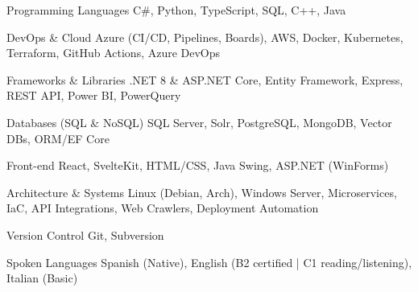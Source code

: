 
\begin{cvskills}
    \cvskill
    {Programming Languages}
    {C\#, Python, TypeScript, SQL, C++, Java}

    \cvskill
    {DevOps \& Cloud}
    {Azure (CI/CD, Pipelines, Boards), AWS, Docker, Kubernetes, Terraform, GitHub Actions, Azure DevOps}

    \cvskill
    {Frameworks \& Libraries}
    {.NET 8 \& ASP.NET Core, Entity Framework, Express, REST API, Power BI, PowerQuery}

    \cvskill
    {Databases (SQL \& NoSQL)}
    {SQL Server, Solr, PostgreSQL, MongoDB, Vector DBs, ORM/EF Core}

    \cvskill
    {Front-end}
    {React, SvelteKit, HTML/CSS, Java Swing, ASP.NET (WinForms)}

    \cvskill
    {Architecture \& Systems}
    {Linux (Debian, Arch), Windows Server, Microservices, IaC, API Integrations,
     Web Crawlers, Deployment Automation}

    \cvskill
    {Version Control}
    {Git, Subversion}

    \cvskill
    {Spoken Languages}
    {Spanish (Native), English (B2 certified | C1 reading/listening), Italian (Basic)}
\end{cvskills}
